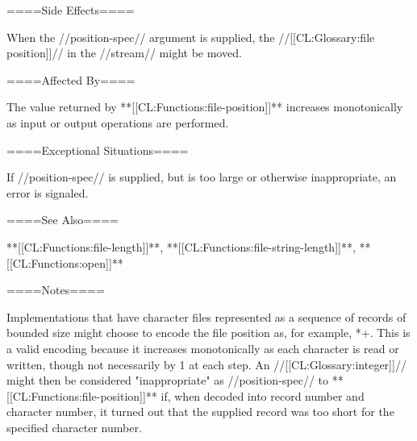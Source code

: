 ====Side Effects====

When the //position-spec// argument is supplied, the //[[CL:Glossary:file position]]// in the //stream// might be moved.

====Affected By====

The value returned by **[[CL:Functions:file-position]]** increases monotonically as input or output operations are performed.

====Exceptional Situations====

If //position-spec// is supplied, but is too large or otherwise inappropriate, an error is signaled.

====See Also====

**[[CL:Functions:file-length]]**, **[[CL:Functions:file-string-length]]**, **[[CL:Functions:open]]**

====Notes====

Implementations that have character files represented as a sequence of records of bounded size might choose to encode the file position as, for example, *+. This is a valid encoding because it increases monotonically as each character is read or written, though not necessarily by 1 at each step. An //[[CL:Glossary:integer]]// might then be considered "inappropriate" as //position-spec// to **[[CL:Functions:file-position]]** if, when decoded into record number and character number, it turned out that the supplied record was too short for the specified character number.

